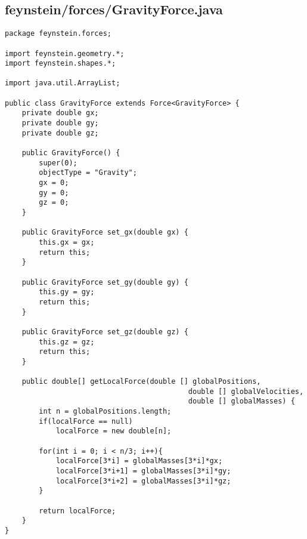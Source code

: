 \subsection*{feynstein/forces/GravityForce.java}
\begin{lstlisting}
package feynstein.forces;

import feynstein.geometry.*;
import feynstein.shapes.*;

import java.util.ArrayList;

public class GravityForce extends Force<GravityForce> {
	private double gx;
	private double gy;
	private double gz;

    public GravityForce() {
		super(0);
		objectType = "Gravity";
		gx = 0;
		gy = 0;
		gz = 0;
    }
 
    public GravityForce set_gx(double gx) {
		this.gx = gx;
		return this;
    }
	
	public GravityForce set_gy(double gy) {
		this.gy = gy;
		return this;
    }
	
	public GravityForce set_gz(double gz) {
		this.gz = gz;
		return this;
    }

	public double[] getLocalForce(double [] globalPositions,
										   double [] globalVelocities,
										   double [] globalMasses) {
		int n = globalPositions.length;
		if(localForce == null)
			localForce = new double[n];
		
		for(int i = 0; i < n/3; i++){
			localForce[3*i] = globalMasses[3*i]*gx;
			localForce[3*i+1] = globalMasses[3*i]*gy;
			localForce[3*i+2] = globalMasses[3*i]*gz;
		}
		
		return localForce;
	}
}
\end{lstlisting}

